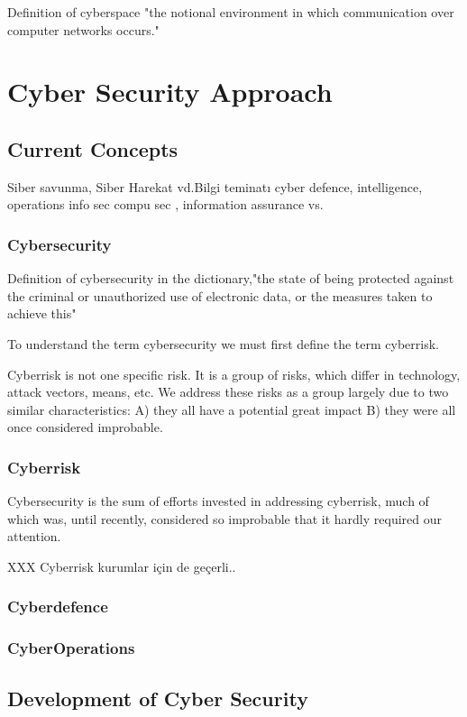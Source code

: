 \documentclass[journal]{IEEEtran}
\begin{document}
Definition of cyberspace "the notional environment in which communication over computer networks occurs." \cite{OxfordDictionary:2013}

\section{Cyber Security Approach}

\subsection{Current Concepts}
Siber savunma, Siber Harekat vd.Bilgi teminatı    cyber defence, intelligence, operations
info sec compu sec , information assurance vs.
\subsubsection{Cybersecurity}

Definition of cybersecurity in the dictionary,"the state of being protected against the criminal or unauthorized use of electronic data, or the measures taken to achieve this"\cite{OxfordDictionary:2013}

To understand the term cybersecurity we must first define the term cyberrisk.

Cyberrisk is not one specific risk. It is a group of risks, which differ in technology, attack vectors, means, etc. We address these risks as a group largely due to two similar characteristics: A) they all have a potential great impact B) they were all once considered improbable.\cite{Barzilay:2013:ISACAOnline}
\subsubsection{Cyberrisk}

Cybersecurity is the sum of efforts invested in addressing cyberrisk, much of which was, until recently, considered so improbable that it hardly required our attention.

XXX Cyberrisk kurumlar için de geçerli..  
\subsubsection{Cyberdefence}
\subsubsection{CyberOperations}

\subsection{Development of Cyber Security}
\end{document}
